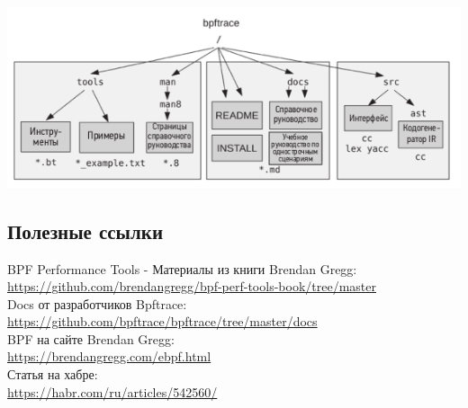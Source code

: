 \includegraphics[width=1.0\linewidth]{structure_bpftrace.png}

\subsection{Полезные ссылки}

\noindent BPF Performance Tools - Материалы из книги Brendan Gregg: \\
\indent \url{https://github.com/brendangregg/bpf-perf-tools-book/tree/master} \\

\noindent Docs от разработчиков Bpftrace: \\
\indent \url{https://github.com/bpftrace/bpftrace/tree/master/docs} \\

\noindent BPF на сайте Brendan Gregg: \\
\indent \url{https://brendangregg.com/ebpf.html} \\

\noindent Статья на хабре: \\
\indent \url{https://habr.com/ru/articles/542560/}
